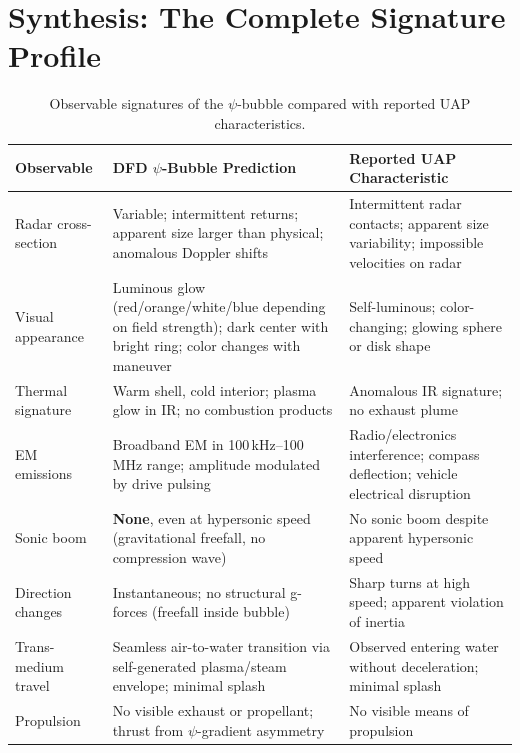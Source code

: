 \documentclass[11pt]{article}
\begin{document}
\section{Synthesis: The Complete Signature Profile}\label{sec:synthesis}

\begin{table}[t]
\centering
\caption{Observable signatures of the $\psi$-bubble compared with
reported UAP characteristics.}
\label{tab:comparison}
\begin{tabular}{p{4cm}p{5cm}p{5cm}}
\toprule
\textbf{Observable} & \textbf{DFD $\psi$-Bubble Prediction}
  & \textbf{Reported UAP Characteristic} \\
\midrule
Radar cross-section &
  Variable; intermittent returns; apparent size larger than physical;
  anomalous Doppler shifts &
  Intermittent radar contacts; apparent size variability;
  impossible velocities on radar \\[4pt]

Visual appearance &
  Luminous glow (red/orange/white/blue depending on field strength);
  dark center with bright ring; color changes with maneuver &
  Self-luminous; color-changing; glowing sphere or disk shape \\[4pt]

Thermal signature &
  Warm shell, cold interior; plasma glow in IR; no combustion products &
  Anomalous IR signature; no exhaust plume \\[4pt]

EM emissions &
  Broadband EM in 100\,kHz--100\,MHz range; amplitude modulated by
  drive pulsing &
  Radio/electronics interference; compass deflection;
  vehicle electrical disruption \\[4pt]

Sonic boom &
  \textbf{None}, even at hypersonic speed (gravitational freefall,
  no compression wave) &
  No sonic boom despite apparent hypersonic speed \\[4pt]

Direction changes &
  Instantaneous; no structural g-forces (freefall inside bubble) &
  Sharp turns at high speed; apparent violation of inertia \\[4pt]

Trans-medium travel &
  Seamless air-to-water transition via self-generated plasma/steam
  envelope; minimal splash &
  Observed entering water without deceleration; minimal splash \\[4pt]

Propulsion &
  No visible exhaust or propellant; thrust from $\psi$-gradient
  asymmetry &
  No visible means of propulsion \\
\bottomrule
\end{tabular}
\end{table}
\end{document}
